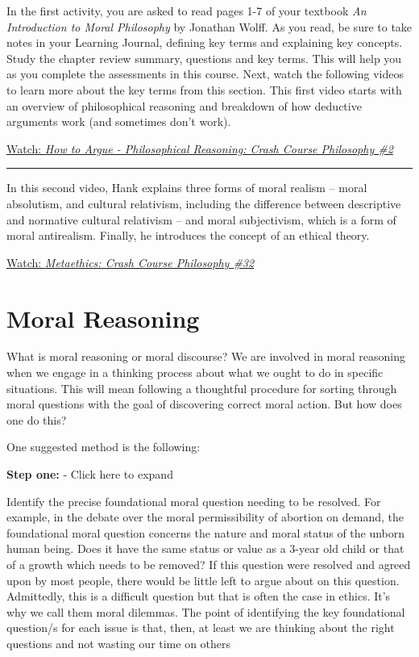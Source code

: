 \documentclass[
]{book}
\begin{document}
\begin{reflect}
In the first activity, you are asked to read pages 1-7 of your textbook \emph{An Introduction to Moral Philosophy} by Jonathan Wolff. As you read, be sure to take notes in your Learning Journal, defining key terms and explaining key concepts. Study the chapter review summary, questions and key terms. This will help you as you complete the assessments in this course.
Next, watch the following videos to learn more about the key terms from this section. This first video starts with an overview of philosophical reasoning and breakdown of how deductive arguments work (and sometimes don't work).

\href{https://www.youtube.com/watch?v=NKEhdsnKKHs}{Watch: \emph{How to Argue - Philosophical Reasoning: Crash Course Philosophy \#2}}

\begin{center}\rule{0.5\linewidth}{0.5pt}\end{center}

In this second video, Hank explains three forms of moral realism -- moral absolutism, and cultural relativism, including the difference between descriptive and normative cultural relativism -- and moral subjectivism, which is a form of moral antirealism. Finally, he introduces the concept of an ethical theory.

\href{https://www.youtube.com/watch?v=FOoffXFpAlU}{Watch: \emph{Metaethics: Crash Course Philosophy \#32}}
\end{reflect}

\hypertarget{moral-reasoning}{%
\section{Moral Reasoning}\label{moral-reasoning}}

What is moral reasoning or moral discourse? We are involved in moral reasoning when we engage in a thinking process about what we ought to do in specific situations. This will mean following a thoughtful procedure for sorting through moral questions with the goal of discovering correct moral action. But how does one do this?

One suggested method is the following:

\textbf{Step one:} - Click here to expand

Identify the precise foundational moral question needing to be resolved. For example, in the debate over the moral permissibility of abortion on demand, the foundational moral question concerns the nature and moral status of the unborn human being. Does it have the same status or value as a 3-year old child or that of a growth which needs to be removed? If this question were resolved and agreed upon by most people, there would be little left to argue about on this question. Admittedly, this is a difficult question but that is often the case in ethics. It's why we call them moral dilemmas. The point of identifying the key foundational question/s for each issue is that, then, at least we are thinking about the right questions and not wasting our time on others
\end{document}
